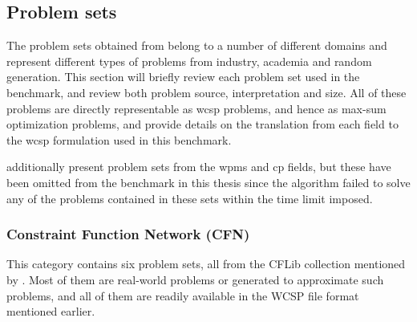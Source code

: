 \subsection{Problem sets}
The problem sets obtained from \textcite{deGivry14} belong to a number of different domains and represent different types of problems from industry, academia and random generation.
This section will briefly review each problem set used in the benchmark, and review both problem source, interpretation and size.
All of these problems are directly representable as \gls{wcsp} problems, and hence as max-sum optimization problems, and \textcite{deGivry14} provide details on the translation from each field to the \gls{wcsp} formulation used in this benchmark.

\Textcite{deGivry14} additionally present problem sets from the \gls{wpms} and \gls{cp} fields, but these have been omitted from the benchmark in this thesis since the algorithm failed to solve any of the problems contained in these sets within the time limit imposed.

\subsubsection{Constraint Function Network (CFN)}
This category contains six problem sets, all from the CFLib collection mentioned by \textcite[\pno~3]{deGivry14}.
Most of them are real-world problems or generated to approximate such problems, and all of them are readily available in the WCSP file format mentioned earlier.

